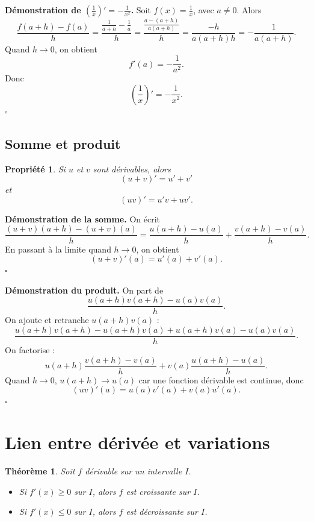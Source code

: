 \documentclass[11pt,a4paper]{article}
\newtheorem{propriete}[definition]{Propriété}
\newtheorem{theoreme}[definition]{Théorème}
\begin{document}
\textbf{Démonstration de \(\left(\frac1x\right)'=-\frac1{x^2}\).}  
Soit \(f(x)=\frac1x\), avec \(a\neq 0\). Alors
\[
\frac{f(a+h)-f(a)}{h}
=
\frac{\frac1{a+h}-\frac1a}{h}
=
\frac{\frac{a-(a+h)}{a(a+h)}}{h}
=
\frac{-h}{a(a+h)h}
=
-\frac1{a(a+h)}.
\]
Quand \(h\to 0\), on obtient
\[
f'(a)=-\frac1{a^2}.
\]
Donc
\[
\left(\frac1x\right)'=-\frac1{x^2}.
\]
\(\square\)

\subsection{Somme et produit}

\begin{propriete}
Si \(u\) et \(v\) sont dérivables, alors
\[
(u+v)'=u'+v'
\]
et
\[
(uv)'=u'v+uv'.
\]
\end{propriete}

\textbf{Démonstration de la somme.}  
On écrit
\[
\frac{(u+v)(a+h)-(u+v)(a)}{h}
=
\frac{u(a+h)-u(a)}{h}+\frac{v(a+h)-v(a)}{h}.
\]
En passant à la limite quand \(h\to 0\), on obtient
\[
(u+v)'(a)=u'(a)+v'(a).
\]
\(\square\)

\textbf{Démonstration du produit.}  
On part de
\[
\frac{u(a+h)v(a+h)-u(a)v(a)}{h}.
\]
On ajoute et retranche \(u(a+h)v(a)\) :
\[
\frac{u(a+h)v(a+h)-u(a+h)v(a)+u(a+h)v(a)-u(a)v(a)}{h}.
\]
On factorise :
\[
u(a+h)\frac{v(a+h)-v(a)}{h}+v(a)\frac{u(a+h)-u(a)}{h}.
\]
Quand \(h\to 0\), \(u(a+h)\to u(a)\) car une fonction dérivable est continue, donc
\[
(uv)'(a)=u(a)v'(a)+v(a)u'(a).
\]
\(\square\)

\section{Lien entre dérivée et variations}

\begin{theoreme}
Soit \(f\) dérivable sur un intervalle \(I\).
\begin{itemize}
    \item Si \(f'(x)\ge 0\) sur \(I\), alors \(f\) est croissante sur \(I\).
    \item Si \(f'(x)\le 0\) sur \(I\), alors \(f\) est décroissante sur \(I\).
\end{itemize}
\end{theoreme}
\end{document}
